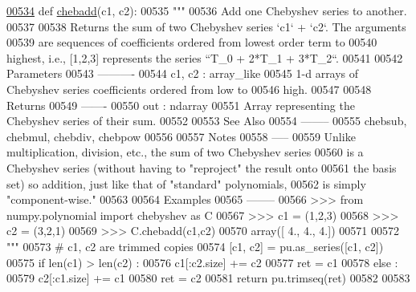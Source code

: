 \begin{DoxyCode}
\hypertarget{namespacepyneb_1_1utils_1_1chebyshev_l00534}{}\hyperlink{namespacepyneb_1_1utils_1_1chebyshev_a06a85eb72ae35925336a6b550dec3f02}{00534} \textcolor{keyword}{def }\hyperlink{namespacepyneb_1_1utils_1_1chebyshev_a06a85eb72ae35925336a6b550dec3f02}{chebadd}(c1, c2):
00535     \textcolor{stringliteral}{"""}
00536 \textcolor{stringliteral}{    Add one Chebyshev series to another.}
00537 \textcolor{stringliteral}{}
00538 \textcolor{stringliteral}{    Returns the sum of two Chebyshev series `c1` + `c2`.  The arguments}
00539 \textcolor{stringliteral}{    are sequences of coefficients ordered from lowest order term to}
00540 \textcolor{stringliteral}{    highest, i.e., [1,2,3] represents the series ``T\_0 + 2*T\_1 + 3*T\_2``.}
00541 \textcolor{stringliteral}{}
00542 \textcolor{stringliteral}{    Parameters}
00543 \textcolor{stringliteral}{    ----------}
00544 \textcolor{stringliteral}{    c1, c2 : array\_like}
00545 \textcolor{stringliteral}{        1-d arrays of Chebyshev series coefficients ordered from low to}
00546 \textcolor{stringliteral}{        high.}
00547 \textcolor{stringliteral}{}
00548 \textcolor{stringliteral}{    Returns}
00549 \textcolor{stringliteral}{    -------}
00550 \textcolor{stringliteral}{    out : ndarray}
00551 \textcolor{stringliteral}{        Array representing the Chebyshev series of their sum.}
00552 \textcolor{stringliteral}{}
00553 \textcolor{stringliteral}{    See Also}
00554 \textcolor{stringliteral}{    --------}
00555 \textcolor{stringliteral}{    chebsub, chebmul, chebdiv, chebpow}
00556 \textcolor{stringliteral}{}
00557 \textcolor{stringliteral}{    Notes}
00558 \textcolor{stringliteral}{    -----}
00559 \textcolor{stringliteral}{    Unlike multiplication, division, etc., the sum of two Chebyshev series}
00560 \textcolor{stringliteral}{    is a Chebyshev series (without having to "reproject" the result onto}
00561 \textcolor{stringliteral}{    the basis set) so addition, just like that of "standard" polynomials,}
00562 \textcolor{stringliteral}{    is simply "component-wise."}
00563 \textcolor{stringliteral}{}
00564 \textcolor{stringliteral}{    Examples}
00565 \textcolor{stringliteral}{    --------}
00566 \textcolor{stringliteral}{    >>> from numpy.polynomial import chebyshev as C}
00567 \textcolor{stringliteral}{    >>> c1 = (1,2,3)}
00568 \textcolor{stringliteral}{    >>> c2 = (3,2,1)}
00569 \textcolor{stringliteral}{    >>> C.chebadd(c1,c2)}
00570 \textcolor{stringliteral}{    array([ 4.,  4.,  4.])}
00571 \textcolor{stringliteral}{}
00572 \textcolor{stringliteral}{    """}
00573     \textcolor{comment}{# c1, c2 are trimmed copies}
00574     [c1, c2] = pu.as\_series([c1, c2])
00575     \textcolor{keywordflow}{if} len(c1) > len(c2) :
00576         c1[:c2.size] += c2
00577         ret = c1
00578     \textcolor{keywordflow}{else} :
00579         c2[:c1.size] += c1
00580         ret = c2
00581     \textcolor{keywordflow}{return} pu.trimseq(ret)
00582 
00583 
\end{DoxyCode}
\hypertarget{namespacepyneb_1_1utils_1_1chebyshev_a1ed2b9248c247449584904025ec9d460}{}
